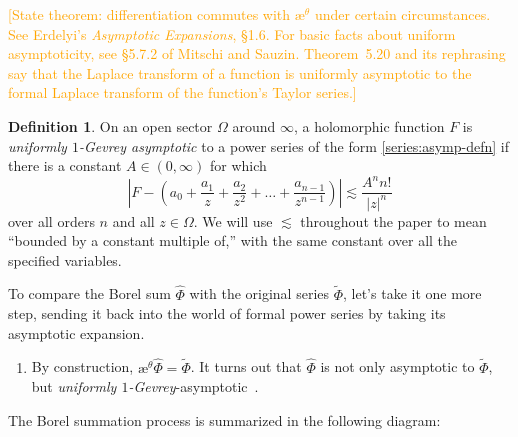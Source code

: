 \documentclass{article}
\newcommand{\series}[1]{\tilde{#1}}
\newcommand{\laplace}{\mathcal{L}}
\newcommand{\borel}{\mathcal{B}}
\newcommand{\aexp}{\text{\ae}}
\theoremstyle{definition}
\newtheorem{defn}{Definition}
\theoremstyle{plain}
\begin{document}
\textcolor{orange}{[State theorem: differentiation commutes with $\aexp^\theta$ under certain circumstances. See Erdelyi's {\em Asymptotic Expansions}, \S 1.6. For basic facts about uniform asymptoticity, see \S 5.7.2 of Mitschi and Sauzin. Theorem~5.20 and its rephrasing say that the Laplace transform of a function is uniformly asymptotic to the formal Laplace transform of the function's Taylor series.]}

\begin{defn}\label{def:unif-gevrey-asymp}
On an open sector $\Omega$ around $\infty$, a holomorphic function $F$ is {\em uniformly $1$-Gevrey asymptotic} to a power series of the form \eqref{series:asymp-defn} if there is a constant $A \in (0, \infty)$ for which
\[ \left|F - \left(a_0 + \frac{a_1}{z} + \frac{a_2}{z^2} + \ldots + \frac{a_{n-1}}{z^{n-1}} \right) \right| \lesssim \frac{A^n n!}{|z|^n} \]
over all orders $n$ and all $z \in \Omega$. We will use $\lesssim$ throughout the paper to mean ``bounded by a constant multiple of,'' with the same constant over all the specified variables.
\end{defn}
To compare the Borel sum $\hat{\Phi}$ with the original series $\series{\Phi}$, let's take it one more step, sending it back into the world of formal power series by taking its asymptotic expansion.

\begin{enumerate}[start=4]
\item By construction, $\aexp^\theta \hat{\Phi} = \series{\Phi}$. It turns out that $\hat{\Phi}$ is not only asymptotic to $\series{\Phi}$, but {\em {uniformly} $1$-Gevrey}-asymptotic~\cite[Corollary~5.23]{diverg-resurg-i}.
\end{enumerate}

The Borel summation process is summarized in the following diagram:
\begin{center}
\end{center}
\end{document}
